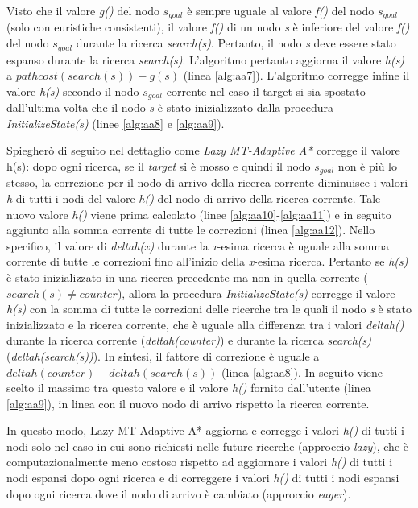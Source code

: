 \documentclass[11pt]{article}
\begin{document}
\par{Visto che il valore \emph{g()} del nodo $s_{goal}$ \`e sempre uguale al valore \emph{f()} del nodo $s_{goal}$ (solo con euristiche consistenti), il valore \emph{f()} di un nodo \emph{s} \`e inferiore del valore \emph{f()} del nodo $s_{goal}$ durante la ricerca \emph{search(s)}. Pertanto, il nodo \emph{s} deve essere stato espanso durante la ricerca \emph{search(s)}. L'algoritmo pertanto aggiorna il valore \emph{h(s)} a $pathcost(search(s)) - g(s)$ (linea \ref{alg:aa7}). L'algoritmo corregge infine il valore \emph{h(s)} secondo il nodo $s_{goal}$ corrente nel caso il target si sia spostato dall'ultima volta che il nodo \emph{s} \`e stato inizializzato dalla procedura \emph{InitializeState(s)} (linee \ref{alg:aa8} e \ref{alg:aa9}).}
\par{Spiegher\`o di seguito nel dettaglio come \emph{Lazy MT-Adaptive A*} corregge il valore h(s): dopo ogni ricerca, se il \emph{target} si \`e mosso e quindi il nodo $s_{goal}$ non \`e pi\`u lo stesso, la correzione per il nodo di arrivo della ricerca corrente diminuisce i valori \emph{h} di tutti i nodi del valore \emph{h()} del nodo di arrivo della ricerca corrente. Tale nuovo valore \emph{h()} viene prima calcolato (linee \ref{alg:aa10}-\ref{alg:aa11}) e in seguito aggiunto alla somma corrente di tutte le correzioni (linea \ref{alg:aa12}). Nello specifico, il valore di \emph{deltah(x)} durante la \emph{x}-esima ricerca \`e uguale alla somma corrente di tutte le correzioni fino all'inizio della \emph{x}-esima ricerca. Pertanto se \emph{h(s)} \`e stato inizializzato in una ricerca precedente ma non in quella corrente ($search(s) \neq counter$), allora la procedura \emph{InitializeState(s)} corregge il valore \emph{h(s)} con la somma di tutte le correzioni delle ricerche tra le quali il nodo \emph{s} \`e stato inizializzato e la ricerca corrente, che \`e uguale alla differenza tra i valori \emph{deltah()} durante la ricerca corrente (\emph{deltah(counter)}) e durante la ricerca \emph{search(s)} (\emph{deltah(search(s))}). In sintesi, il fattore di correzione \`e uguale a $deltah(counter) - deltah(search(s))$ (linea \ref{alg:aa8}). In seguito viene scelto il massimo tra questo valore e il valore \emph{h()} fornito dall'utente (linea \ref{alg:aa9}), in linea con il nuovo nodo di arrivo rispetto la ricerca corrente.}
\par{In questo modo, Lazy MT-Adaptive A* aggiorna e corregge i valori \emph{h()} di tutti i nodi solo nel caso in cui sono richiesti nelle future ricerche (approccio \emph{lazy}), che \`e computazionalmente meno costoso rispetto ad aggiornare i valori \emph{h()} di tutti i nodi espansi dopo ogni ricerca e di correggere i valori \emph{h()} di tutti i nodi espansi dopo ogni ricerca dove il nodo di arrivo \`e cambiato (approccio \emph{eager}).} 
\end{document}
